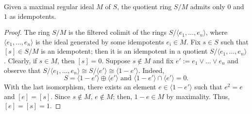 \begin{lemma}
\label{lem:A23}
    Given a maximal regular ideal $M$ of $S$, the quotient ring $S/M$ admits only $0$ and $1$ as idempotents.
    \begin{proof}
        The ring $S/M$ is the filtered colimit of the rings $S/\langle e_1,\dots, e_n\rangle$, where $\langle e_1,\dots, e_n\rangle$ is the ideal generated by some idempotents $e_i\in M$. Fix $s\in S$ such that $[s]\in S/M$ is an idempotent; then it is an idempotent in a quotient $S/\langle e_1,\dots, e_n\rangle$. Clearly, if $s\in M$, then $[s]=0$. Suppose $s\not\in M$ and fix $e':=e_1\vee\dots\vee e_n$ and observe that $S/\langle e_1,\dots, e_n\rangle\cong S/\langle e'\rangle\cong \langle1-e'\rangle$. Indeed, 
        \[S=\langle1-e'\rangle\oplus\langle e'\rangle\text{ and }\langle1-e'\rangle\cap\langle e'\rangle=0.\]
        With the last isomorphism, there exists an element $e\in\langle1-e'\rangle$ such that $e^2=e$ and $[e]=[s]$. Since $s\not \in M$, $e\not\in M$; then, $1-e\in M$ by maximality. Thus, $[e]=[s]=1$.
    \end{proof}
\end{lemma}


